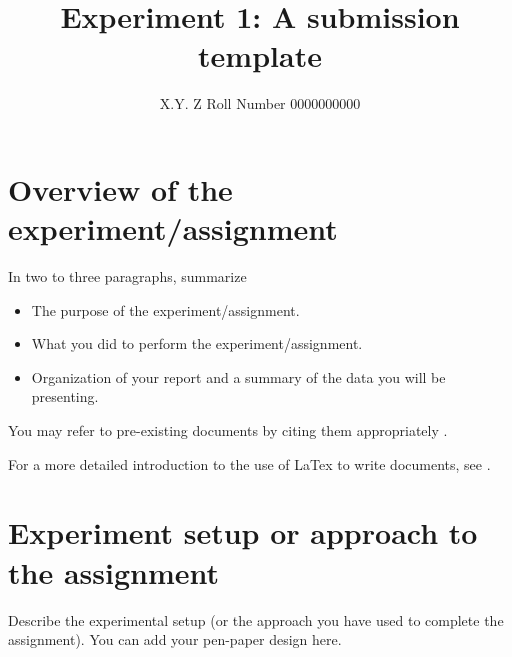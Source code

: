 \documentclass[12pt]{article}
\title{Experiment 1: A submission template}
\author{X.Y.  Z Roll Number 0000000000}
\begin{document}
\maketitle

\section{Overview of the experiment/assignment}

In two to three paragraphs, summarize 
\begin{itemize}
\item The purpose of the experiment/assignment.
\item What you did to perform the experiment/assignment.
\item Organization of your report and a summary of the
data you will be presenting.
\end{itemize}

\noindent You may refer to pre-existing documents by
citing them appropriately \cite{ref:Ramayana}.

\noindent For a more detailed introduction to the use of
LaTex to write documents, see \cite{ref:LatexTutorial}.

\section{Experiment setup or approach to the assignment}

Describe the experimental setup (or the approach you have used
to complete the assignment). You can add your pen-paper design here.
\end{document}
